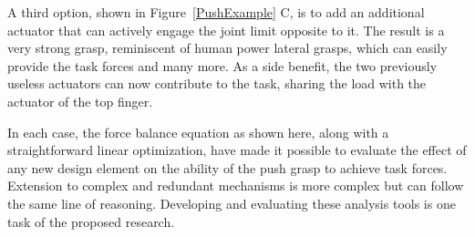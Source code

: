 A third option, shown in Figure~\ref{PushExample} C, is to add an additional actuator that can actively engage the joint limit opposite to it.   The result is a very strong grasp, reminiscent of human power lateral grasps, which can easily provide the task forces and many more.   As a side benefit, the two previously useless actuators can now contribute to the task, sharing the load with the actuator of the top finger.

In each case, the force balance equation as shown here, along with a straightforward linear optimization, have made it possible to evaluate the effect of any new design element on the ability of the push grasp to achieve task forces. Extension to complex and redundant mechanisms is more complex but can follow the same line of reasoning.   Developing and evaluating these analysis tools is one task of the proposed research.
